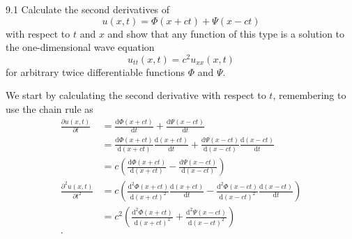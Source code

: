 
\begin{problem}{9.1}
  Calculate the second derivatives of
  \[ 
  u(x,t) = \Phi(x + ct) + \Psi(x-ct)
  \]
  with respect to $t$ and $x$ and show that any function of this type is a solution to the one-dimensional wave equation
  \[ 
  u_{t t}(x,t) = c^2 u_{x x}(x,t)
  \]
  for arbitrary twice differentiable functions $\Phi$ and $\Psi$.
\end{problem}

\begin{derivation}
  We start by calculating the second derivative with respect to $t$, remembering to use the chain rule as
  \begin{align*}
    \frac{\partial u(x,t)}{\partial t} &= \frac{\mathrm{d} \Phi(x+ct)}{\mathrm{d} t} + \frac{\mathrm{d} \Psi(x-ct)}{\mathrm{d} t}  \\
    &= \frac{\mathrm{d}\Phi(x+ct)}{\mathrm{d}(x + ct)} \frac{\mathrm{d}(x+ct)}{\mathrm{d}t} + \frac{\mathrm{d}\Psi(x-ct)}{\mathrm{d}(x-ct)} \frac{\mathrm{d}(x-ct)}{\mathrm{d}t}   \\
    &= c \left( \frac{\mathrm{d}\Phi(x+ct)}{\mathrm{d}(x+ct)} - \frac{\mathrm{d}\Psi(x-ct)}{\mathrm{d}(x-ct)}  \right) \\
    \frac{\partial^2 u(x,t)}{\partial t^2} &= c \left( \frac{\mathrm{d}^2\Phi(x+ct)}{\mathrm{d}(x+ct)^2} \frac{\mathrm{d}(x+ct)}{\mathrm{d}t} - \frac{\mathrm{d}^2\Phi(x-ct)}{\mathrm{d}(x-ct)^2} \frac{\mathrm{d}(x-ct)}{\mathrm{d}t}   \right) \\
    &= c^2 \left( \frac{\mathrm{d}^2 \Phi(x+ct)}{\mathrm{d}(x+ct)^2} + \frac{\mathrm{d}^2 \Psi(x-ct)}{\mathrm{d}(x-ct)^2}   \right) \\
  .\end{align*}


\end{derivation}

